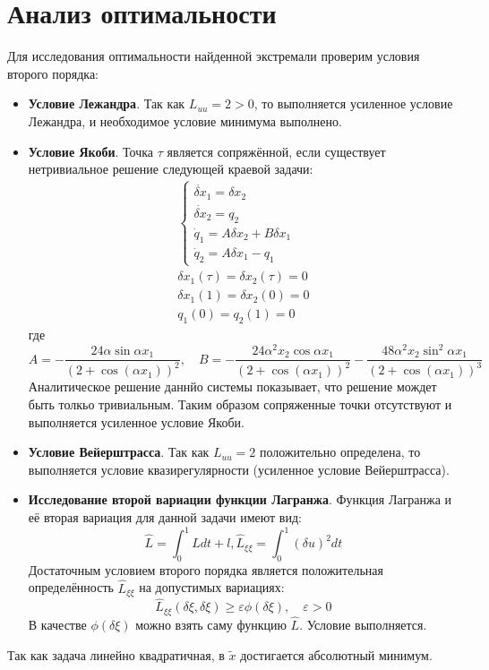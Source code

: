 \documentclass[a4paper,12pt]{article}
\begin{document}
\section*{Анализ оптимальности}
Для исследования оптимальности найденной экстремали проверим условия второго порядка:
\begin{itemize}
  \item \textbf{Условие Лежандра}. Так как \(L_{uu}=2 > 0\), то выполняется усиленное условие Лежандра, и необходимое условие минимума выполнено.
  \item \textbf{Условие Якоби}. Точка \(\tau\) является сопряжённой, если существует нетривиальное решение следующей краевой задачи:
  \begin{gather*}
    \begin{cases}
      \dot{\delta x}_1=\delta x_2\\
      \dot{\delta x}_2=q_2 \\
      \dot{q}_1=A\delta x_2 +B \delta x_1\\
      \dot{q}_2=A\delta x_1-q_1
    \end{cases}\\
    \delta x_1(\tau)=\delta x_2(\tau)=0\\
    \delta x_1(1) =\delta x_2(0)=0\\
    q_1(0)=q_2(1)=0
  \end{gather*}
  где
  \begin{equation*}
    A=-\frac{24\alpha \sin{\alpha x_1}}{\left(2+\cos(\alpha x_1)\right)^2}, \quad B=-\frac{24\alpha^2 x_2\cos{\alpha x_1}}{\left(2+\cos(\alpha x_1)\right)^2}-\frac{48\alpha^2 x_2\sin^2{\alpha x_1}}{\left(2+\cos(\alpha x_1)\right)^3}
  \end{equation*}
  Аналитическое решение даннйо системы показывает, что решение мождет быть толкьо тривиальным. Таким образом сопряженные точки отсутствуют и выполняется усиленное условие Якоби.
  \item \textbf{Условие Вейерштрасса}. Так как \(L_{uu}=2\) положительно определена, то выполняется условие квазирегулярности (усиленное условие Вейерштрасса).
  \item \textbf{Исследование второй вариации функции Лагранжа}. Функция Лагранжа и её вторая вариация для данной задачи имеют вид:
  \begin{equation*}
    \hat{L}=\int_0^1L dt+l, \hat{L}_{\xi\xi}=\int_0^1(\delta u)^2 dt
  \end{equation*}
  Достаточным условием второго порядка является положительная определённость \(\hat{L}_{\xi\xi}\) на допустимых вариациях:
  \begin{equation*}
    \hat{L}_{\xi\xi}(\delta\xi,\delta\xi) \ge \varepsilon \phi(\delta\xi), \quad \varepsilon > 0
  \end{equation*}
  В качестве \(\phi(\delta\xi)\) можно взять саму функцию \(\hat{L}\). Условие выполняется.
\end{itemize}
Так как задача линейно квадратичная, в \(\tilde{x}\) достигается абсолютный минимум.
\end{document}
